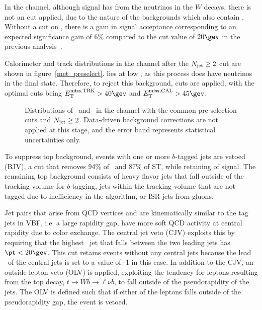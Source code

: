 In the \emme channel, although signal has \etmiss from the neutrinos in the
$W$ decays, there is not an \etmiss cut applied, due to the nature of
the backgrounds which also contain \etmiss. Without a cut on
\etmiss, there is a gain in signal acceptance corresponding to an expected
significance gain of 6\% compared to the cut value of $20 \gev$ in the previous
analysis~\cite{bib:hww_moriond_2013}. 

Calorimeter and track \etmiss distributions in the \eemm channel after the $N_{\textrm{jet}} \geq 2$
cut are shown in figure~\ref{met_preselect}. \ZDYll lies at low \etmiss,
as this process does have neutrinos in the final state. Therefore, to reject this
background, \etmiss cuts are applied, with the optimal cuts being
$\trkmet>40 \gev$ and $\calomet >45 \gev$.

\begin{figure}[h]
    \centering
    \caption{Distributions of~
      \calomet and~ \trkmet in
      the \eemm channel with the common pre-selection cuts and $N_{\textrm{jet}}
      \geq 2$. Data-driven background corrections are not applied at
      this stage, and the error band represents statistical
      uncertainties only.}
\label{chap:analysis:fig:met_preselect}
\end{figure}

To suppress top background, events with one or more $b$-tagged jets
are vetoed (BJV), a cut that removes 94\% of \ttbar~and 87\% of ST, while
retaining  of signal. The remaining top background
consists of heavy flavor jets that fall outside of the tracking volume for
$b$-tagging, jets within the tracking volume that are not tagged due
to inefficiency in the algorithm, or ISR jets from gluons. 

Jet pairs that arise from QCD vertices and are kinematically similar
to the tag jets in VBF, i.e. a large
rapidity gap, have more soft QCD activity at central rapidity due to
color exchange. The central jet veto (CJV) exploits this by requiring
that the highest \pt~jet that falls between the two leading jets has
$\pt<20 \gev$. This cut retains events without any central jets
because the lead \pt~of the central jets is set to a value of -1 in
this case. In addition to the CJV, an outside lepton veto (OLV) is
applied, exploiting the tendency for leptons resulting from the top decay,
$t\rightarrow{Wb}\rightarrow{\ell\nu b}$, to fall outside of the
pseudorapidity of the jets. The OLV is defined such that if either of
the leptons falls outside of the pseudorapidity gap, the event is
vetoed. 

